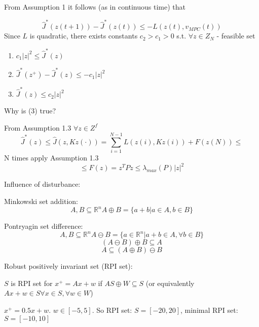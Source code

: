 From Assumption 1 it follows (as in continuous time) that 

\begin{equation*}
\hat J^*(z(t+1)) - \hat J^*(z(t)) \leq - L(z(t), v_{MPC}(t))
\end{equation*}
Since $L$ is quadratic, there exists constants $c_2 > c_1 > 0$ s.t. $\forall z \in Z_N $ - feasible set
\begin{enumerate}
\item $c_1|z|^2 \leq \hat J^*(z)$
\item $\hat J^*(z^+) - \hat J^*(z) \leq - c_1 |z|^2$
\item $\hat J^*(z) \leq c_2|z|^2$
\end{enumerate}

Why is (3) true?

From Assumption 1.3 $\forall z \in Z^f$
\begin{equation*}
\hat J^*(z) \leq \hat J(z,Kz(\cdot)) = \sum_{i=1}^{N-1}L(z(i),Kz(i)) + F(z(N)) \leq 
\end{equation*}
N times apply Assumption 1.3
\begin{equation*}
\leq F(z) = z^TPz \leq \lambda_{max}(P)|z|^2
\end{equation*}

Influence of disturbance:
\begin{Definition}
Minkowski set addition: 
\begin{equation*}
A,B \subseteq \mathbb{R}^n A \oplus B = \{ a+b | a \in A, b\in B\}
\end{equation*}

Pontryagin set difference:
\begin{equation*}
A, B \subseteq \mathbb{R}^n A \ominus B = \{ a \in \mathbb{R}^n| a+b \in A, \forall b \in B\}
\end{equation*}
\begin{equation*}
(A \ominus B) \oplus B \subseteq A
\end{equation*}
\begin{equation*}
A \subseteq (A \oplus B) \ominus B
\end{equation*}
\end{Definition}
\begin{Definition}

Robust positively invariant set (RPI set):

$S$ is RPI set for $x^+=Ax+w$ if $AS \oplus W \subseteq S$ (or equivalently $Ax+w \in S \forall x \in S, \forall w \in W$)
\end{Definition}
\begin{Example}

$x^+ = 0.5x + w$. $w \in [-5,5]$. So RPI set: $S = [-20, 20]$, minimal RPI set: $S = [-10,10]$
\end{Example}

